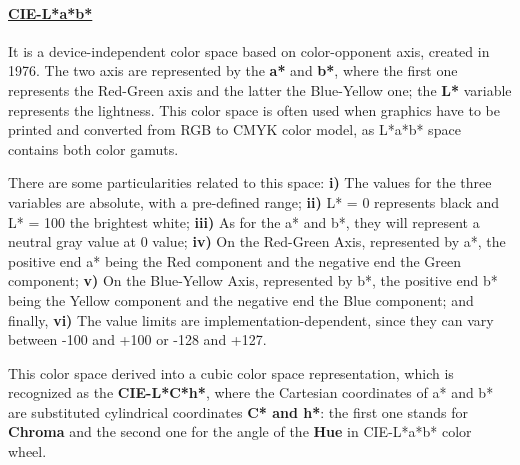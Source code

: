 \paragraph{\underline{CIE-L*a*b*}} It is a device-independent color space based on color-opponent axis,
created in 1976. The two axis are represented by the \textbf{a*} and \textbf{b*}, where the first one represents the
Red-Green axis and the latter the Blue-Yellow one; the \textbf{L*} variable represents the lightness. This
color space is often used when graphics have to be printed and converted from RGB to CMYK color model, as
L*a*b* space contains both color gamuts. \par
There are some particularities related to this space: \textbf{i)} The values for the
three variables are absolute, with a pre-defined range; \textbf{ii)} L* = 0 represents black and L* = 100 the brightest white;
\textbf{iii)} As for the a* and b*, they will represent a neutral gray value at 0 value; \textbf{iv)} On the Red-Green Axis,
represented by a*, the positive end a* being the Red component and the negative end the Green component; \textbf{v)}
On the Blue-Yellow Axis, represented by b*, the positive end b* being the Yellow component and the negative end the Blue component;
 and finally, \textbf{vi)} The value limits are implementation-dependent, since they can vary between -100 and +100 or -128 and +127. \par
This color space derived into a cubic color space representation, which is recognized as the
\textbf{CIE-L*C*h*}, where the Cartesian coordinates of a* and b* are substituted cylindrical coordinates
\textbf{C* and h*}: the first one stands for \textbf{Chroma} and the second one for the angle of the
\textbf{Hue} in CIE-L*a*b* color wheel. \par
%
